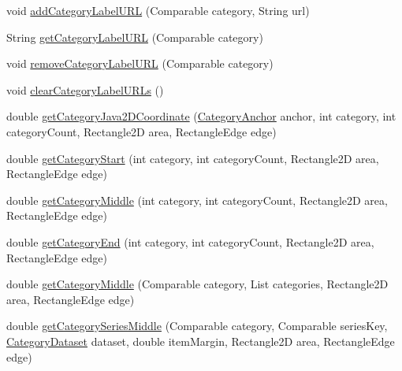 \begin{DoxyCompactItemize}
\item 
void \mbox{\hyperlink{classorg_1_1jfree_1_1chart_1_1axis_1_1_category_axis_a305f59a6b2cd0512e01e4b08de21d36b}{add\+Category\+Label\+U\+RL}} (Comparable category, String url)
\item 
String \mbox{\hyperlink{classorg_1_1jfree_1_1chart_1_1axis_1_1_category_axis_ae0e6190663aa8502333afbc11492e72b}{get\+Category\+Label\+U\+RL}} (Comparable category)
\item 
void \mbox{\hyperlink{classorg_1_1jfree_1_1chart_1_1axis_1_1_category_axis_a37bd2f2448d6ba0903b8b4d0ee98adf4}{remove\+Category\+Label\+U\+RL}} (Comparable category)
\item 
void \mbox{\hyperlink{classorg_1_1jfree_1_1chart_1_1axis_1_1_category_axis_a6ee7ce39072375794c23ac3d1221d2da}{clear\+Category\+Label\+U\+R\+Ls}} ()
\item 
double \mbox{\hyperlink{classorg_1_1jfree_1_1chart_1_1axis_1_1_category_axis_a820b51b8e335ffa81adbc9c7956f6a05}{get\+Category\+Java2\+D\+Coordinate}} (\mbox{\hyperlink{classorg_1_1jfree_1_1chart_1_1axis_1_1_category_anchor}{Category\+Anchor}} anchor, int category, int category\+Count, Rectangle2D area, Rectangle\+Edge edge)
\item 
double \mbox{\hyperlink{classorg_1_1jfree_1_1chart_1_1axis_1_1_category_axis_a8e7a9d3d57bd4af3e114b3c7f645c88a}{get\+Category\+Start}} (int category, int category\+Count, Rectangle2D area, Rectangle\+Edge edge)
\item 
double \mbox{\hyperlink{classorg_1_1jfree_1_1chart_1_1axis_1_1_category_axis_a36f926e006732155c6447adc813765cd}{get\+Category\+Middle}} (int category, int category\+Count, Rectangle2D area, Rectangle\+Edge edge)
\item 
double \mbox{\hyperlink{classorg_1_1jfree_1_1chart_1_1axis_1_1_category_axis_a4ec54d3044c08950959afdd622326c36}{get\+Category\+End}} (int category, int category\+Count, Rectangle2D area, Rectangle\+Edge edge)
\item 
double \mbox{\hyperlink{classorg_1_1jfree_1_1chart_1_1axis_1_1_category_axis_a122c5f8a2973b0974f70455de71e221e}{get\+Category\+Middle}} (Comparable category, List categories, Rectangle2D area, Rectangle\+Edge edge)
\item 
double \mbox{\hyperlink{classorg_1_1jfree_1_1chart_1_1axis_1_1_category_axis_a733824a0bf9ea7ca867b3891a25a5af3}{get\+Category\+Series\+Middle}} (Comparable category, Comparable series\+Key, \mbox{\hyperlink{interfaceorg_1_1jfree_1_1data_1_1category_1_1_category_dataset}{Category\+Dataset}} dataset, double item\+Margin, Rectangle2D area, Rectangle\+Edge edge)

\end{DoxyCompactItemize}
